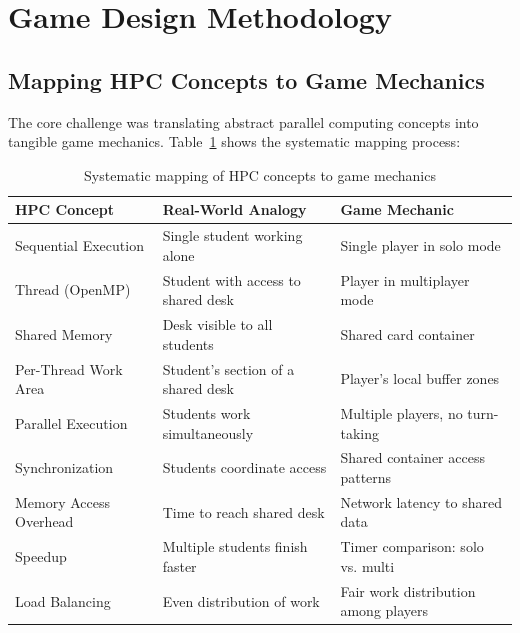 \section{Game Design Methodology}
\label{sec:game-design}

\subsection{Mapping HPC Concepts to Game Mechanics}
\label{subsec:concept-mapping}

The core challenge was translating abstract parallel computing concepts into tangible game mechanics. Table~\ref{tab:concept-mapping-methodology} shows the systematic mapping process:

\begin{table}[htbp]
    \centering
    \caption{Systematic mapping of HPC concepts to game mechanics}
    \label{tab:concept-mapping-methodology}
    \begin{tabular}{@{}p{3.5cm}p{4cm}p{5cm}@{}}
        \toprule
        \textbf{HPC Concept}   & \textbf{Real-World Analogy}        & \textbf{Game Mechanic}               \\
        \midrule
        Sequential Execution   & Single student working alone       & Single player in solo mode           \\
        \midrule
        Thread (OpenMP)        & Student with access to shared desk & Player in multiplayer mode           \\
        \midrule
        Shared Memory          & Desk visible to all students       & Shared card container                \\
        \midrule
        Per-Thread Work Area   & Student's section of a shared desk & Player's local buffer zones          \\
        \midrule
        Parallel Execution     & Students work simultaneously       & Multiple players, no turn-taking     \\
        \midrule
        Synchronization        & Students coordinate access         & Shared container access patterns     \\
        \midrule
        Memory Access Overhead & Time to reach shared desk          & Network latency to shared data       \\
        \midrule
        Speedup                & Multiple students finish faster    & Timer comparison: solo vs. multi     \\
        \midrule
        Load Balancing         & Even distribution of work          & Fair work distribution among players \\
        \bottomrule
    \end{tabular}
\end{table}

